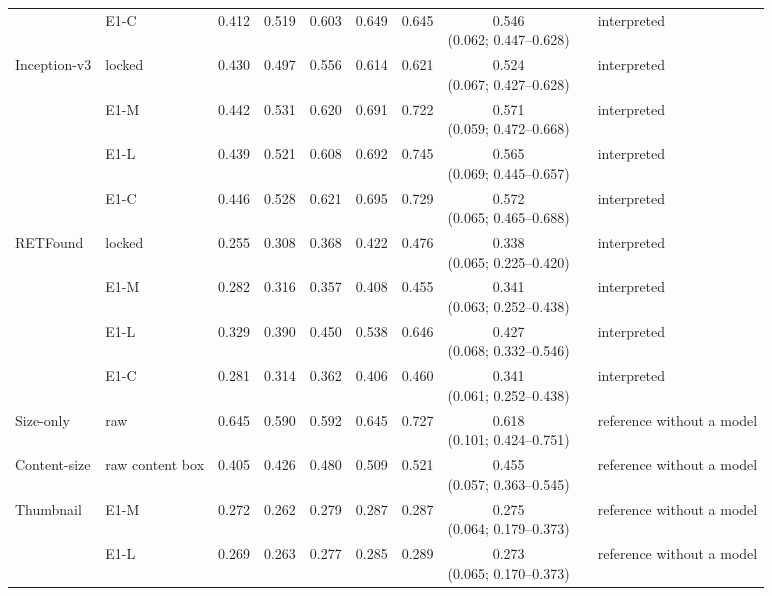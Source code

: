 \begin{longtable}{@{}p{3.0cm}lcccccclp{2.2cm}@{}}
 & E1-C & 0.412 & 0.519 & 0.603 & 0.649 & 0.645 & \makecell{0.546\\{\scriptsize (0.062; 0.447--0.628)}} &  & interpreted \\
Inception-v3 & locked & 0.430 & 0.497 & 0.556 & 0.614 & 0.621 & \makecell{0.524\\{\scriptsize (0.067; 0.427--0.628)}} &  & interpreted \\
 & E1-M & 0.442 & 0.531 & 0.620 & 0.691 & 0.722 & \makecell{0.571\\{\scriptsize (0.059; 0.472--0.668)}} &  & interpreted \\
 & E1-L & 0.439 & 0.521 & 0.608 & 0.692 & 0.745 & \makecell{0.565\\{\scriptsize (0.069; 0.445--0.657)}} &  & interpreted \\
 & E1-C & 0.446 & 0.528 & 0.621 & 0.695 & 0.729 & \makecell{0.572\\{\scriptsize (0.065; 0.465--0.688)}} &  & interpreted \\
RETFound & locked & 0.255 & 0.308 & 0.368 & 0.422 & 0.476 & \makecell{0.338\\{\scriptsize (0.065; 0.225--0.420)}} &  & interpreted \\
 & E1-M & 0.282 & 0.316 & 0.357 & 0.408 & 0.455 & \makecell{0.341\\{\scriptsize (0.063; 0.252--0.438)}} &  & interpreted \\
 & E1-L & 0.329 & 0.390 & 0.450 & 0.538 & 0.646 & \makecell{0.427\\{\scriptsize (0.068; 0.332--0.546)}} &  & interpreted \\
 & E1-C & 0.281 & 0.314 & 0.362 & 0.406 & 0.460 & \makecell{0.341\\{\scriptsize (0.061; 0.252--0.438)}} &  & interpreted \\
Size-only & raw & 0.645 & 0.590 & 0.592 & 0.645 & 0.727 & \makecell{0.618\\{\scriptsize (0.101; 0.424--0.751)}} &  & reference without a model \\
Content-size & raw content box & 0.405 & 0.426 & 0.480 & 0.509 & 0.521 & \makecell{0.455\\{\scriptsize (0.057; 0.363--0.545)}} &  & reference without a model \\
Thumbnail & E1-M & 0.272 & 0.262 & 0.279 & 0.287 & 0.287 & \makecell{0.275\\{\scriptsize (0.064; 0.179--0.373)}} &  & reference without a model \\
 & E1-L & 0.269 & 0.263 & 0.277 & 0.285 & 0.289 & \makecell{0.273\\{\scriptsize (0.065; 0.170--0.373)}} &  & reference without a model \\

\end{longtable}
